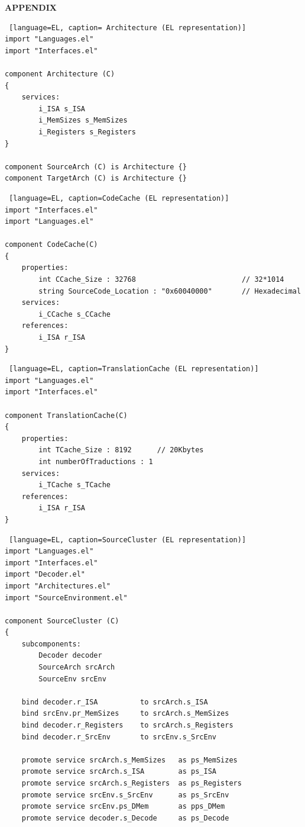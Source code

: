 \documentclass[12pt]{article}
\begin{document}
{\newpage
\begin{appendices}
\huge \textbf{APPENDIX}
\end{appendices}


\begin{lstlisting} [language=EL, caption= Architecture (EL representation)]
import "Languages.el"
import "Interfaces.el"

component Architecture (C)
{
	services:
		i_ISA s_ISA
		i_MemSizes s_MemSizes
		i_Registers s_Registers
}

component SourceArch (C) is Architecture {}
component TargetArch (C) is Architecture {}
\end{lstlisting}


\begin{lstlisting} [language=EL, caption=CodeCache (EL representation)]
import "Interfaces.el"
import "Languages.el"

component CodeCache(C)
{
	properties:
		int CCache_Size : 32768							// 32*1014
		string SourceCode_Location : "0x60040000"		// Hexadecimal
	services:
		i_CCache s_CCache
	references:
		i_ISA r_ISA
}
\end{lstlisting}


\begin{lstlisting} [language=EL, caption=TranslationCache (EL representation)]
import "Languages.el"
import "Interfaces.el"

component TranslationCache(C)
{
	properties:
		int TCache_Size : 8192 		// 20Kbytes
		int numberOfTraductions : 1	
	services:
		i_TCache s_TCache
	references:
		i_ISA r_ISA	
}
\end{lstlisting}

\newpage
\begin{lstlisting} [language=EL, caption=SourceCluster (EL representation)]
import "Languages.el"
import "Interfaces.el"
import "Decoder.el"
import "Architectures.el"
import "SourceEnvironment.el"

component SourceCluster (C)
{
	subcomponents:
		Decoder decoder
		SourceArch srcArch
		SourceEnv srcEnv	
	 
	bind decoder.r_ISA 			to srcArch.s_ISA
	bind srcEnv.pr_MemSizes 	to srcArch.s_MemSizes
	bind decoder.r_Registers 	to srcArch.s_Registers
	bind decoder.r_SrcEnv		to srcEnv.s_SrcEnv
	
	promote service srcArch.s_MemSizes	 as ps_MemSizes
	promote service srcArch.s_ISA 		 as ps_ISA
	promote service srcArch.s_Registers  as ps_Registers 
	promote service srcEnv.s_SrcEnv 	 as ps_SrcEnv
	promote service srcEnv.ps_DMem		 as pps_DMem
	promote service decoder.s_Decode	 as ps_Decode
	

\end{lstlisting}}
\end{document}
